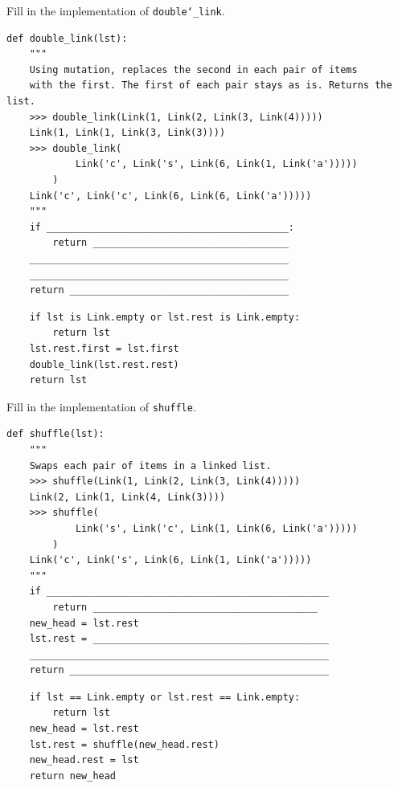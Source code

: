 \documentclass{exam}
\begin{document}
\begin{questions}
\begin{blocksection}
\question Fill in the implementation of \texttt{double\char`_link}.

\begin{lstlisting}
def double_link(lst):
    """
    Using mutation, replaces the second in each pair of items
    with the first. The first of each pair stays as is. Returns the list.
    >>> double_link(Link(1, Link(2, Link(3, Link(4)))))
    Link(1, Link(1, Link(3, Link(3))))
    >>> double_link(
            Link('c', Link('s', Link(6, Link(1, Link('a')))))
        )
    Link('c', Link('c', Link(6, Link(6, Link('a')))))
    """
    if __________________________________________:
        return __________________________________
    _____________________________________________
    _____________________________________________
    return ______________________________________
\end{lstlisting}
\begin{solution}[0.5in]
\begin{lstlisting}
    if lst is Link.empty or lst.rest is Link.empty:
        return lst
    lst.rest.first = lst.first
    double_link(lst.rest.rest)
    return lst
\end{lstlisting}
\end{solution}
\end{blocksection}

\begin{blocksection}
\question Fill in the implementation of \texttt{shuffle}.

\begin{lstlisting}
def shuffle(lst):
    """
    Swaps each pair of items in a linked list.
    >>> shuffle(Link(1, Link(2, Link(3, Link(4)))))
    Link(2, Link(1, Link(4, Link(3))))
    >>> shuffle(
            Link('s', Link('c', Link(1, Link(6, Link('a')))))
        )
    Link('c', Link('s', Link(6, Link(1, Link('a')))))
    """
    if _________________________________________________
        return _______________________________________
    new_head = lst.rest
    lst.rest = _________________________________________
    ____________________________________________________
    return _____________________________________________
\end{lstlisting}

\begin{solution}[0.5in]
\begin{lstlisting}
    if lst == Link.empty or lst.rest == Link.empty:
        return lst
    new_head = lst.rest
    lst.rest = shuffle(new_head.rest)
    new_head.rest = lst
    return new_head
\end{lstlisting}
\end{solution}
\end{blocksection}


\end{questions}
\end{document}

